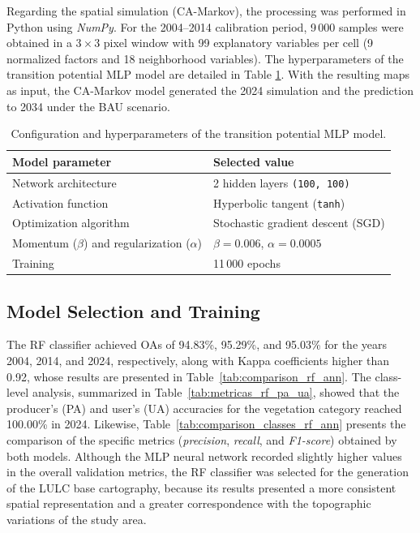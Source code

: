 \documentclass[runningheads]{llncs}
\begin{document}
 Regarding the spatial simulation (CA-Markov), the processing was performed in Python using \textit{NumPy}. For the 2004--2014 calibration period, 9\,000 samples were obtained in a $3 \times 3$ pixel window with 99 explanatory variables per cell (9 normalized factors and 18 neighborhood variables). The hyperparameters of the transition potential MLP model are detailed in Table \ref{tab:setup_simulacion_transicion}. With the resulting maps as input, the CA-Markov model generated the 2024 simulation and the prediction to 2034 under the BAU scenario.

\begin{table}[t]
\centering
\caption{Configuration and hyperparameters of the transition potential MLP model.}
\label{tab:setup_simulacion_transicion}
\small
\begin{tabular}{l l}
\hline
Model parameter & Selected value \\
\hline
Network architecture & 2 hidden layers \texttt{(100, 100)} \\
Activation function & Hyperbolic tangent (\texttt{tanh}) \\
Optimization algorithm & Stochastic gradient descent (SGD) \\
Momentum ($\beta$) and regularization ($\alpha$) & $\beta = 0.006$, $\alpha = 0.0005$ \\
Training & 11\,000 epochs \\
\hline
\end{tabular}
\end{table}

\subsection{Model Selection and Training}
\label{subsec:res_seleccion_modelos}

The RF classifier achieved OAs of 94.83\%, 95.29\%, and 95.03\% for the years 2004, 2014, and 2024, respectively, along with Kappa coefficients higher than 0.92, whose results are presented in Table~\ref{tab:comparison_rf_ann}. The class-level analysis, summarized in Table~\ref{tab:metricas_rf_pa_ua}, showed that the producer's (PA) and user's (UA) accuracies for the vegetation category reached 100.00\% in 2024. Likewise, Table~\ref{tab:comparison_classes_rf_ann} presents the comparison of the specific metrics (\textit{precision}, \textit{recall}, and \textit{F1-score}) obtained by both models. Although the MLP neural network recorded slightly higher values in the overall validation metrics, the RF classifier was selected for the generation of the LULC base cartography, because its results presented a more consistent spatial representation and a greater correspondence with the topographic variations of the study area.
\end{document}
